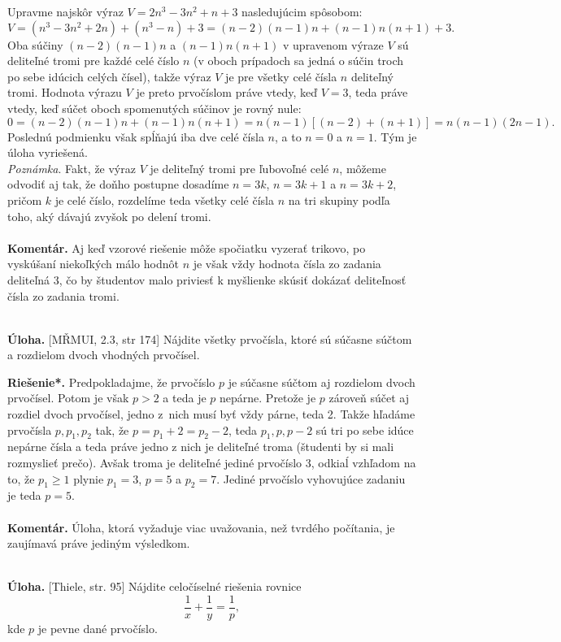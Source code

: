 \documentclass[11pt,a4paper,oneside,final]{book}
\newcommand{\kom}{\textbf{Komentár.} }
\newcommand{\ul}{\textbf{Úloha.} }
\newcommand{\rieh}{\textbf{Riešenie*.} }
\begin{document}
Upravme najskôr výraz $V = 2n^3 - 3n^2 + n + 3$ nasledujúcim spôsobom:
$$V = (n^3 - 3n^2+ 2n) + (n^3 - n) + 3 = (n - 2)(n - 1)n + (n - 1)n(n + 1) + 3.$$
Oba súčiny $(n-2)(n-1)n$ a $(n-1)n(n+1)$ v upravenom výraze $V$ sú deliteľné tromi pre každé celé číslo $n$ (v oboch prípadoch sa jedná o súčin troch po sebe idúcich celých čísel), takže výraz $V$ je pre všetky celé čísla $n$ deliteľný tromi. Hodnota výrazu $V$ je preto prvočíslom práve vtedy, keď $V = 3$, teda práve vtedy, keď súčet oboch spomenutých súčinov je rovný nule:
$$0 = (n - 2)(n - 1)n + (n - 1)n(n + 1) = n(n - 1)[(n - 2) + (n + 1)] = n(n - 1)(2n - 1).$$
Poslednú podmienku však spĺňajú iba dve celé čísla $n$, a to $n = 0$ a $n = 1$. Tým je úloha vyriešená.\\
\textit{Poznámka}. Fakt, že výraz $V$ je deliteľný tromi pre ľubovoľné celé $n$, môžeme odvodiť aj tak, že doňho postupne dosadíme $n = 3k$, $n = 3k + 1$ a $n = 3k + 2$, pričom $k$ je celé číslo, rozdelíme teda všetky celé čísla $n$ na tri skupiny podľa toho, aký dávajú zvyšok po delení tromi.\\
\\
\kom Aj keď vzorové riešenie môže spočiatku vyzerať trikovo, po vyskúšaní niekoľkých málo hodnôt $n$ je však vždy hodnota čísla zo zadania deliteľná 3, čo by študentov malo priviesť k myšlienke skúsiť dokázať deliteľnosť čísla zo zadania tromi.\\
\\
\begin{tcolorbox}[breakable,notitle,boxrule=0pt,colback=light-gray,colframe=light-gray]\ul [MŘMUI, 2.3, str 174] Nájdite všetky prvočísla, ktoré sú súčasne súčtom a rozdielom dvoch vhodných prvočísel.

\end{tcolorbox}

\rieh Predpokladajme, že prvočíslo $p$ je súčasne súčtom aj rozdielom dvoch prvočísel. Potom je však $p>2$ a teda je $p$ nepárne. Pretože je $p$ zároveň súčet aj rozdiel dvoch prvočísel, jedno z~nich musí byť vždy párne, teda 2. Takže hľadáme prvočísla $p, p_1, p_2$ tak, že $p=p_1+2=p_2-2$, teda $p_1, p, p-2$ sú tri po sebe idúce nepárne čísla a teda práve jedno z nich je deliteľné troma (študenti by si mali rozmyslieť prečo). Avšak troma je deliteľné jediné prvočíslo 3, odkiaĺ vzhľadom na to, že $p_1\geq 1$ plynie $p_1=3$, $p=5$ a $p_2=7$. Jediné prvočíslo vyhovujúce zadaniu je teda $p=5$.\\
\\
\kom Úloha, ktorá vyžaduje viac uvažovania, než tvrdého počítania, je zaujímavá práve jediným výsledkom.\\
\\
\begin{tcolorbox}[breakable,notitle,boxrule=0pt,colback=light-gray,colframe=light-gray]\ul [Thiele, str. 95] Nájdite celočíselné riešenia rovnice $$\frac{1}{x}+\frac{1}{y}=\frac{1}{p},$$ kde $p$ je pevne dané prvočíslo.

\end{tcolorbox}
\end{document}
